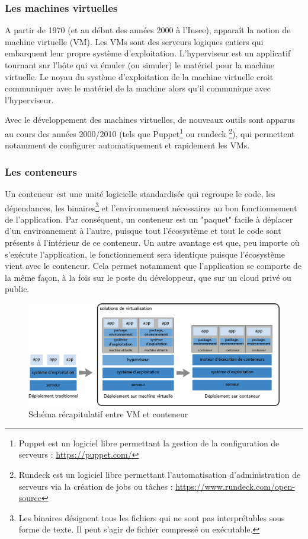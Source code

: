 \documentclass[11pt,fleqn]{book} %
\begin{document}
\subsubsection{Les machines virtuelles}
A partir de 1970 (et au début des années 2000 à l'Insee), apparaît  la notion de machine virtuelle (VM). Les VMs sont des serveurs logiques entiers qui embarquent leur propre système d’exploitation. L’hyperviseur est un applicatif tournant sur l’hôte qui va émuler (ou simuler) le matériel pour la machine virtuelle. Le noyau du système d’exploitation de la machine virtuelle croit communiquer avec le matériel de la machine alors qu’il communique avec l’hyperviseur.

Avec le développement des machines virtuelles, de nouveaux outils sont apparus au cours des années 2000/2010 (tels que Puppet\footnote{Puppet est un logiciel libre permettant la gestion de la configuration de serveurs : \url{https://puppet.com/}} ou rundeck \footnote{Rundeck est un logiciel libre permettant l'automatisation d'administration de serveurs via la création de jobs ou tâches : \url{https://www.rundeck.com/open-source}}), qui permettent notamment de configurer automatiquement et rapidement les VMs.


\subsubsection{Les conteneurs}
Un conteneur est une unité logicielle standardisée qui regroupe le code, les dépendances, les binaires\footnote{Les binaires désignent tous les fichiers qui ne sont pas interprétables sous forme de texte. Il peut s'agir de fichier compressé ou exécutable.} et l'environnement nécessaires au bon fonctionnement de l'application. Par conséquent, un conteneur est un "paquet" facile à déplacer d'un environnement à l'autre, puisque tout l'écosystème et tout le code sont présents à l'intérieur de ce conteneur. Un autre avantage est que, peu importe où s'exécute l'application, le fonctionnement sera identique puisque l'écosystème vient avec le conteneur. Cela permet notamment que l'application se comporte de la même façon, à la fois sur le poste du développeur, que sur un cloud privé ou public. \\




\begin{figure}[H]
\renewcommand{\figurename}{Schéma}
\hspace{-1cm}
\includegraphics[scale=0.7]{Pictures/container_evolution.png}
\captionsetup{margin=1.5cm,format=hang,justification=justified}
\caption[]{Schéma récapitulatif entre VM et conteneur \newline}
\end{figure}
\end{document}
